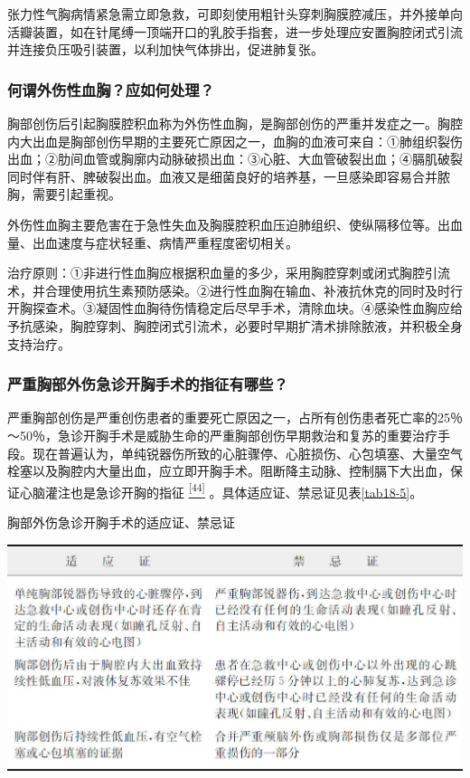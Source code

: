 张力性气胸病情紧急需立即急救，可即刻使用粗针头穿刺胸膜腔减压，并外接单向活瓣装置，如在针尾缚一顶端开口的乳胶手指套，进一步处理应安置胸腔闭式引流并连接负压吸引装置，以利加快气体排出，促进肺复张。

\subsubsection{何谓外伤性血胸？应如何处理？}

胸部创伤后引起胸膜腔积血称为外伤性血胸，是胸部创伤的严重并发症之一。胸腔内大出血是胸部创伤早期的主要死亡原因之一，血胸的血液可来自：①肺组织裂伤出血；②肋间血管或胸廓内动脉破损出血：③心脏、大血管破裂出血；④膈肌破裂同时伴有肝、脾破裂出血。血液又是细菌良好的培养基，一旦感染即容易合并脓胸，需要引起重视。

外伤性血胸主要危害在于急性失血及胸膜腔积血压迫肺组织、使纵隔移位等。出血量、出血速度与症状轻重、病情严重程度密切相关。

治疗原则：①非进行性血胸应根据积血量的多少，采用胸腔穿刺或闭式胸腔引流术，并合理使用抗生素预防感染。②进行性血胸在输血、补液抗休克的同时及时行开胸探查术。③凝固性血胸待伤情稳定后尽早手术，清除血块。④感染性血胸应给予抗感染，胸腔穿刺、胸腔闭式引流术，必要时早期扩清术排除脓液，并积极全身支持治疗。

\subsubsection{严重胸部外伤急诊开胸手术的指征有哪些？}

严重胸部创伤是严重创伤患者的重要死亡原因之一，占所有创伤患者死亡率的25％～50％，急诊开胸手术是威胁生命的严重胸部创伤早期救治和复苏的重要治疗手段。现在普遍认为，单纯锐器伤所致的心脏骤停、心脏损伤、心包填塞、大量空气栓塞以及胸腔内大量出血，应立即开胸手术。阻断降主动脉、控制膈下大出血，保证心脑灌注也是急诊开胸的指征
\protect\hyperlink{text00024.htmlux5cux23ch44-23}{\textsuperscript{{[}44{]}}}
。具体适应证、禁忌证见表\ref{tab18-5}。

\begin{table}[htbp]
\centering
\caption{胸部外伤急诊开胸手术的适应证、禁忌证}
\label{tab18-5}
\includegraphics{./images/Image00145.jpg}
\end{table}

